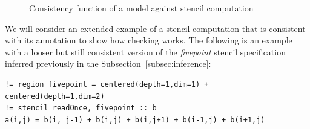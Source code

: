 \documentclass[9pt]{sigplanconf}
\theoremstyle{definition}
\begin{document}
\begin{figure}

\caption{Consistency function of a model against stencil computation}
\label{fig:consistency}
\end{figure}

We will consider an extended example of a stencil computation that is
consistent with its annotation to show how checking works. The following is an
example with a looser but still consistent version of the \textit{fivepoint}
stencil specification inferred previously in the
Subsection~\ref{subsec:inference}:
%
\begin{verbatim}
!= region fivepoint = centered(depth=1,dim=1) + centered(depth=1,dim=2)
!= stencil readOnce, fivepoint :: b
a(i,j) = b(i, j-1) + b(i,j) + b(i,j+1) + b(i-1,j) + b(i+1,j)
\end{verbatim}
%
\end{document}

